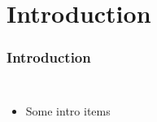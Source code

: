 \section{Introduction}

\begin{frame}
    \frametitle{Introduction}
\begin{columns}
\begin{itemize}
    \item Some intro items
\end{itemize}
\begin{figure}
\centering
\end{figure}
\end{columns}
\end{frame}
